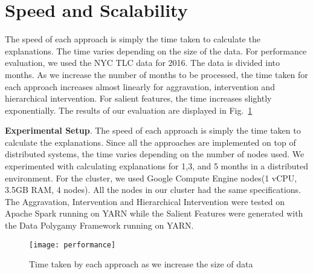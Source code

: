 




\section{Speed and Scalability}
\label{sec:speed}
The speed of each approach is simply the time taken to calculate the explanations. The time varies depending on the size of the data. For performance evaluation, we used the NYC TLC data for 2016. The data is divided into months. As we increase the number of months to be processed, the time taken for each approach increases almost linearly for aggravation, intervention and hierarchical intervention. For salient features, the time increases slightly exponentially. The results of our evaluation are displayed in Fig.~\ref{fig:performance}

\textbf{Experimental Setup}. The speed of each approach is simply the time taken to calculate the explanations. Since all the approaches are implemented on top of distributed systems, the time varies depending on the number of nodes used. We experimented with calculating explanations for 1,3, and 5 months in a distributed environment. For the cluster, we used Google Compute Engine nodes(1 vCPU, 3.5GB RAM, 4 nodes). All the nodes in our cluster had the same specifications. The Aggravation, Intervention and Hierarchical Intervention were tested on Apache Spark running on YARN while the Salient Features were generated with the Data Polygamy Framework running on YARN.
\begin{figure}[h]
\texttt{[image: performance]}
\caption{Time taken by each approach as we increase the size of data}
\label{fig:performance}
\end{figure}

